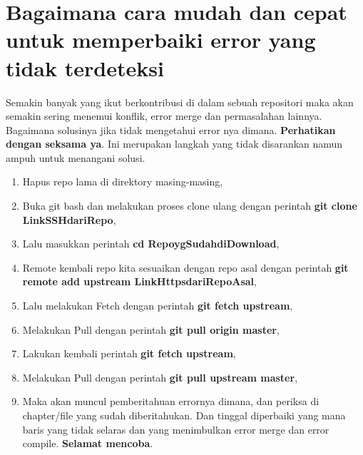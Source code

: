 \section{Bagaimana cara mudah dan cepat untuk memperbaiki error yang tidak terdeteksi}
Semakin banyak yang ikut berkontribusi di dalam sebuah repositori maka akan semakin sering menemui konflik, error merge dan permasalahan lainnya. Bagaimana solusinya jika tidak mengetahui error nya dimana. \textbf{Perhatikan dengan seksama ya}. Ini merupakan langkah yang tidak disarankan namun ampuh untuk menangani solusi.
\begin{enumerate}
  \item Hapus repo lama di direktory masing-masing,
  \item Buka git bash dan melakukan proses clone ulang dengan perintah \textbf{git clone LinkSSHdariRepo},
  \item Lalu masukkan perintah \textbf{cd RepoygSudahdiDownload},
  \item Remote kembali repo kita sesuaikan dengan repo asal dengan perintah \textbf{git remote add upstream LinkHttpsdariRepoAsal},
  \item Lalu melakukan Fetch dengan perintah \textbf{git fetch upstream},
\item Melakukan Pull dengan perintah \textbf{git pull origin master},
\item Lakukan kembali perintah \textbf{git fetch upstream},
\item Melakukan Pull dengan perintah \textbf{git pull upstream master},
\item Maka akan muncul pemberitahuan errornya dimana, dan periksa di chapter/file yang sudah diberitahukan. Dan tinggal diperbaiki yang mana baris yang tidak selaras dan yang menimbulkan error merge dan error compile. \textbf{Selamat mencoba}.
\end{enumerate} 